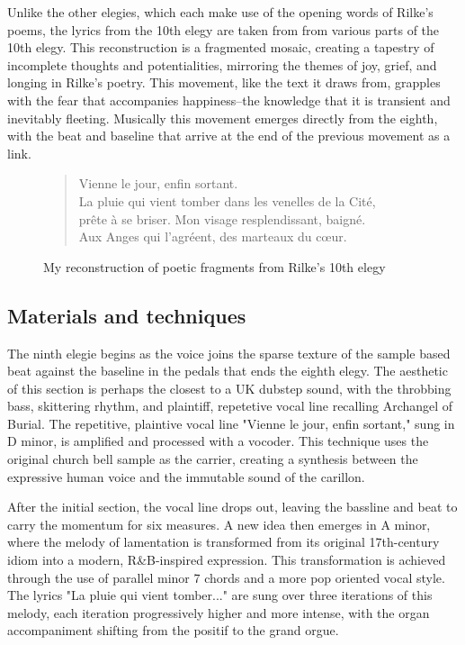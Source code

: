 \documentclass[12pt,twoside,maitrise]{dms_ks}
\theoremstyle{definition}
\begin{document}
Unlike the other elegies, which each make use of the opening words of Rilke's poems, the lyrics from the 10th elegy are taken from from various parts of the 10th elegy. 
This reconstruction is a fragmented mosaic, creating a tapestry of incomplete thoughts and potentialities, mirroring the themes of joy, grief, and longing in Rilke’s poetry. 
This movement, like the text it draws from, grapples with the fear that accompanies happiness--the knowledge that it is transient and inevitably fleeting. 
Musically this movement emerges directly from the eighth, with the beat and baseline that arrive at the end of the previous movement as a link.

\begin{figure}[H]
\begin{verse}
Vienne le jour, enfin sortant.\\ 
La pluie qui vient tomber dans les venelles de la Cité,\\ 
prête à se briser. Mon visage resplendissant, baigné.\\ 
Aux Anges qui l'agréent, des marteaux du cœur.\\
\end{verse}  
\caption{My reconstruction of poetic fragments from Rilke's 10th elegy} 
\end{figure}

\subsection{Materials and techniques}

The ninth elegie begins as the voice joins the sparse texture of the sample based beat against the baseline in the pedals that ends the eighth elegy. 
The aesthetic of this section is perhaps the closest to a UK dubstep sound, with the throbbing bass, skittering rhythm, and plaintiff, repetetive vocal line recalling Archangel of Burial. 
The repetitive, plaintive vocal line "Vienne le jour, enfin sortant," sung in D minor, is amplified and processed with a vocoder. 
This technique uses the original church bell sample as the carrier, creating a synthesis between the expressive human voice and the immutable sound of the carillon.


After the initial section, the vocal line drops out, leaving the bassline and beat to carry the momentum for six measures. 
A new idea then emerges in A minor, where the melody of lamentation is transformed from its original 17th-century idiom into a modern, R\&B-inspired expression. 
This transformation is achieved through the use of parallel minor 7 chords and a more pop oriented vocal style. 
The lyrics "La pluie qui vient tomber..." are sung over three iterations of this melody, each iteration progressively higher and more intense, with the organ accompaniment shifting from the positif to the grand orgue.
\end{document}
